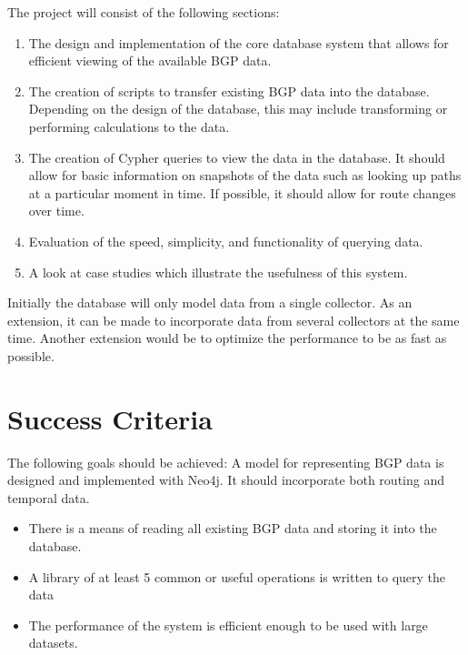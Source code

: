 The project will consist of the following sections:

\begin{enumerate}

\item The design and implementation of the core database system that allows for efficient viewing of the available BGP data.

\item The creation of scripts to transfer existing BGP data into the database. Depending on the design of the database, this may include transforming or performing calculations to the data. 

\item The creation of Cypher queries to view the data in the database. It should allow for basic information on snapshots of the data such as looking up paths at a particular moment in time. If possible, it should allow for route changes over time.

\item Evaluation of the speed, simplicity, and functionality of querying data.

\item A look at case studies which illustrate the usefulness of this system.

\end{enumerate}

Initially the database will only model data from a single collector. As an extension, it can be made to incorporate data from several collectors at the same time. Another extension would be to optimize the performance to be as fast as possible.  

\section*{Success Criteria}

The following goals should be achieved: 
A model for representing BGP data is designed and implemented with Neo4j. It should incorporate both routing and temporal data.

\begin{itemize}

\item There is a means of reading all existing BGP data and storing it into the database.

\item A library of at least 5 common or useful operations is written to query the data

\item The performance of the system is efficient enough to be used with large datasets.

\end{itemize}


